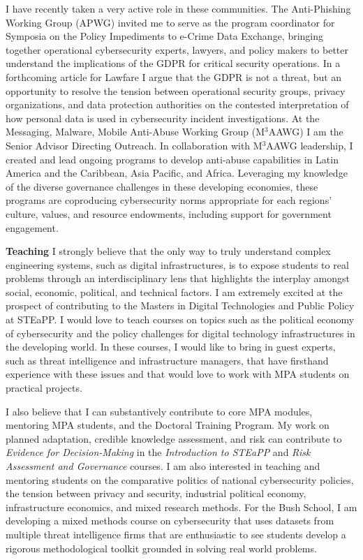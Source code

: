 \documentclass[11pt]{letter}
\begin{document}
\begin{letter}
I have recently taken a very active role in these communities. The
Anti-Phishing Working Group (APWG) invited me to serve as the program
coordinator for Symposia on the Policy Impediments to e-Crime Data
Exchange, bringing together operational cybersecurity experts,
lawyers, and policy makers to better understand the implications of
the GDPR for critical security operations. 
%
In a forthcoming article for Lawfare I argue that the 
GDPR is not a threat, but an opportunity to resolve the tension
between operational security groups, privacy organizations, and data
protection authorities on the contested interpretation of how personal
data is used in cybersecurity incident investigations. 
%
At the Messaging, Malware, Mobile Anti-Abuse Working Group (M$^3$AAWG)
I am the Senior Advisor Directing Outreach.
%
In collaboration with M$^3$AAWG leadership, I created and lead ongoing
programs to 
develop anti-abuse capabilities in Latin America and the Caribbean, Asia Pacific, and Africa. 
%
Leveraging my knowledge of the diverse governance challenges in these
developing economies, these programs are coproducing cybersecurity
norms appropriate for each regions' culture, values, and resource
endowments, including support for government engagement.


\textbf{Teaching} \vspace{0.2 \baselineskip} \newline 
I strongly believe that the only way to truly understand complex
engineering systems, such as digital infrastructures, is to expose
students to real problems through an interdisciplinary lens that
highlights the interplay amongst social, economic, political, and
technical factors. 
%
I am extremely excited at the prospect of contributing to the Masters
in Digital Technologies and Public Policy at STEaPP. 
%
I would love to teach courses on topics such as the political economy
of cybersecurity and the policy challenges for digital technology
infrastructures in the developing world. 
%
In these courses, I would like to bring in guest experts, such as threat intelligence and infrastructure managers, that have firsthand experience with these issues and that would love to work with MPA students on practical projects. 


I also believe that I can substantively contribute to core MPA modules,
mentoring MPA students, and the Doctoral Training Program. 
%
My work on planned adaptation, credible knowledge
assessment, and risk can contribute to \emph{Evidence for
  Decision-Making} in
the \emph{Introduction to STEaPP} and \emph{Risk Assessment and Governance}
courses. 
%
I am also interested in teaching and mentoring students on the
comparative politics of national cybersecurity policies, the tension
between privacy and security, industrial political economy,
infrastructure economics, and mixed research methods. 
%
For the Bush School, I am developing a mixed methods course on cybersecurity that uses datasets from multiple threat intelligence firms that are enthusiastic to see students develop a rigorous methodological toolkit grounded in solving real world problems. 


\end{letter}
\end{document}
